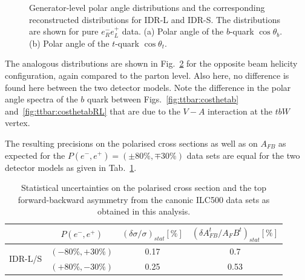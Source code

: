 \begin{figure}[htbp]
\begin{subfigure}{0.475\hsize}
 \caption{  \label{fig:ttbar:costhetatRL}}
 \end{subfigure}
\caption{Generator-level polar angle distributions and the corresponding reconstructed distributions for IDR-L and IDR-S. The distributions are shown for pure $e^-_R e^+_L$ data.
(a) Polar angle of the $b$-quark $\cos{\theta_b}$. 
(b) Polar angle of the $t$-quark $\cos{\theta_t}$.
}
\label{fig:ttbar:resultRL}
\end{figure}

The analogous distributions are shown in Fig.~\ref{fig:ttbar:resultRL} for the opposite beam helicity configuration, again compared to the parton level. Also here, no difference is found here between the two detector models.  Note the difference in the polar angle spectra of the $b$ quark between Figs.~\ref{fig:ttbar:costhetab} and~\ref{fig:ttbar:costhetabRL} that are due to the $V-A$ interaction at the $tbW$ vertex.

The resulting precisions on the polarised cross sections as well as on $A_{FB}$ as expected for the $P(e^-,e^+)=(\pm 80\%, \mp 30\%)$ data sets are equal for the two detector models as given in Tab.~\ref{tab:AFBtt}.

\begin{table}[htb]
\begin{center}
\begin{tabular}{|c|c|c|c|}
\hline
 & $P(e^-,e^+)$ & $(\delta\sigma / \sigma)_{stat} [\%]$ & $(\delta A_{FB}^t / A_FB^t)_{stat} [\%]$ \\
\hline
\multirow{2}{*}{IDR-L/S} &  $(-80\%,+30\%)$ & 0.17 & 0.7 \\
                         &  $(+80\%,-30\%)$ & 0.25 & 0.53 \\
\hline
\end{tabular}
\end{center}
\caption{Statistical uncertainties on the polarised cross section and the top forward-backward asymmetry from the canonic ILC500 data sets as obtained in this analysis.}
\label{tab:AFBtt}   
\end{table}    

